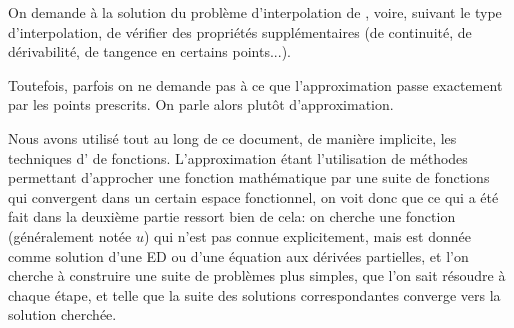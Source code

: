 \begin{histoire}
\medskip
{}
\end{histoire}


On demande à la solution du problème d'interpolation de , 
voire, suivant le type d'interpolation, de vérifier des propriétés supplémentaires (de continuité,
de dérivabilité, de tangence en certains points...).

Toutefois, parfois on ne demande pas à ce que l'approximation passe exactement
par les points prescrits. On parle alors plutôt d'approximation.

\medskip
Nous avons utilisé tout au long de ce document, de manière implicite, les techniques 
d' de fonctions.
L'approximation étant l'utilisation de méthodes permettant d'approcher une fonction mathématique 
par une suite de fonctions qui convergent dans un  certain espace fonctionnel, on voit donc que ce qui 
a été fait dans la deuxième partie ressort bien de cela:
on cherche une fonction (généralement notée $u$) qui n'est pas connue explicitement, mais est donnée 
comme solution d'une ED ou d'une équation aux dérivées partielles, et l'on cherche à construire une suite de problèmes plus simples, 
que l'on sait résoudre à chaque étape, et telle que la suite des solutions correspondantes converge 
vers la solution cherchée.

